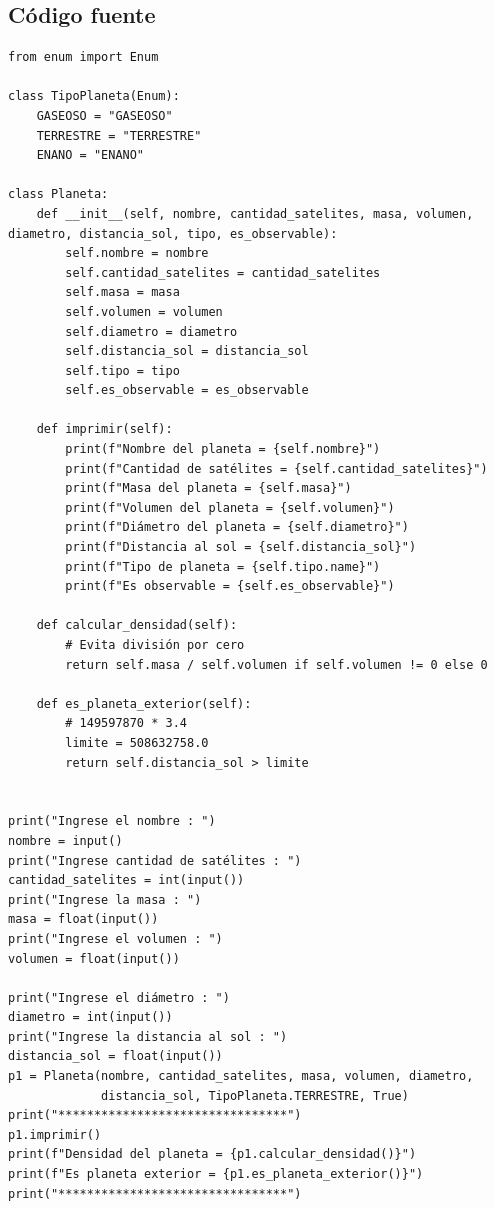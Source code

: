 \documentclass[11pt, a4paper]{article}
\begin{document}
\subsection{Código fuente}
\begin{lstlisting}
from enum import Enum

class TipoPlaneta(Enum):
    GASEOSO = "GASEOSO"
    TERRESTRE = "TERRESTRE"
    ENANO = "ENANO"

class Planeta:
    def __init__(self, nombre, cantidad_satelites, masa, volumen, diametro, distancia_sol, tipo, es_observable):
        self.nombre = nombre
        self.cantidad_satelites = cantidad_satelites
        self.masa = masa
        self.volumen = volumen
        self.diametro = diametro
        self.distancia_sol = distancia_sol
        self.tipo = tipo
        self.es_observable = es_observable

    def imprimir(self):
        print(f"Nombre del planeta = {self.nombre}")
        print(f"Cantidad de satélites = {self.cantidad_satelites}")
        print(f"Masa del planeta = {self.masa}")
        print(f"Volumen del planeta = {self.volumen}")
        print(f"Diámetro del planeta = {self.diametro}")
        print(f"Distancia al sol = {self.distancia_sol}")
        print(f"Tipo de planeta = {self.tipo.name}")
        print(f"Es observable = {self.es_observable}")

    def calcular_densidad(self):
        # Evita división por cero
        return self.masa / self.volumen if self.volumen != 0 else 0

    def es_planeta_exterior(self):
        # 149597870 * 3.4
        limite = 508632758.0
        return self.distancia_sol > limite


print("Ingrese el nombre : ")
nombre = input()
print("Ingrese cantidad de satélites : ")
cantidad_satelites = int(input())
print("Ingrese la masa : ")
masa = float(input())
print("Ingrese el volumen : ")
volumen = float(input())

print("Ingrese el diámetro : ")
diametro = int(input())
print("Ingrese la distancia al sol : ")
distancia_sol = float(input())
p1 = Planeta(nombre, cantidad_satelites, masa, volumen, diametro,
             distancia_sol, TipoPlaneta.TERRESTRE, True)
print("********************************")
p1.imprimir()
print(f"Densidad del planeta = {p1.calcular_densidad()}")
print(f"Es planeta exterior = {p1.es_planeta_exterior()}")
print("********************************")
\end{lstlisting}
\end{document}
